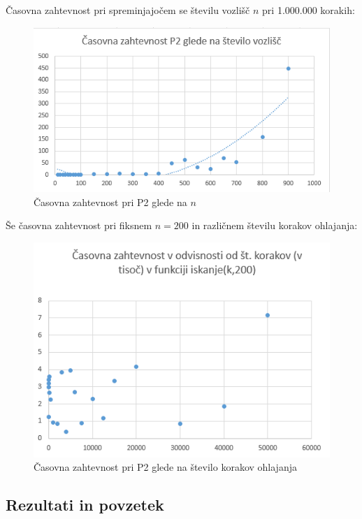 \documentclass[a4paper, 12 pt]{article}
\begin{document}
Časovna zahtevnost pri spreminjajočem se številu vozlišč $n$ pri 1.000.000 korakih:

\begin{figure}[H]
\centering
  \includegraphics[width=12cm]{casovna_p2_n.png}
  \caption{Časovna zahtevnost pri P2 glede na $n$}
  \label{fig:p2_časovna_zaht_n} 
\end{figure}

\vspace{1cm}

Še časovna zahtevnost pri fiksnem $n = 200$ in različnem številu korakov ohlajanja:

\begin{figure}[H]
\centering
  \includegraphics[width=12cm]{casovna_p2_korak.png}
  \caption{Časovna zahtevnost pri P2 glede na število korakov ohlajanja}
  \label{fig:p2_časovna_zaht_korak} 
\end{figure}


\subsection{Rezultati in povzetek}
\end{document}
